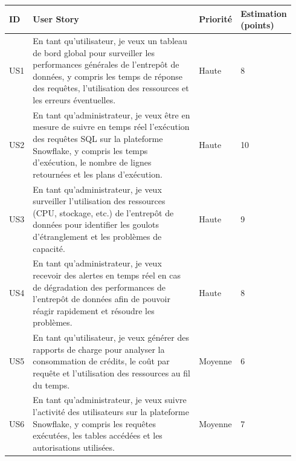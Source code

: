 \begin{center}

    \begin{longtable}{|p{0.05\linewidth}|p{0.65\linewidth}|p{0.12\linewidth}|p{0.12\linewidth}|}
        \hline       
        \rowcolor{blue!18}\textbf{ID} & \textbf{User Story} &  \textbf{Priorité} & \textbf{Estimation (points)} \\
        \hline
        \endfirsthead
        US1 &  En tant qu'utilisateur, je veux un tableau de bord global pour surveiller les performances générales de l'entrepôt de données, y compris les temps de réponse des requêtes, l'utilisation des ressources et les erreurs éventuelles. & Haute & 8 \\
        
        \hline
        
        US2 &  En tant qu'administrateur, je veux être en mesure de suivre en temps réel l'exécution des requêtes SQL sur la plateforme Snowflake, y compris les temps d'exécution, le nombre de lignes retournées et les plans d'exécution. & Haute & 10 \\
        
        \hline
        
        US3 &  En tant qu'administrateur, je veux surveiller l'utilisation des ressources (CPU, stockage, etc.) de l'entrepôt de données pour identifier les goulots d'étranglement et les problèmes de capacité. & Haute & 9 \\
        
        \hline
        
        US4 &  En tant qu'administrateur, je veux recevoir des alertes en temps réel en cas de dégradation des performances de l'entrepôt de données afin de pouvoir réagir rapidement et résoudre les problèmes. & Haute & 8 \\
        
        \hline
        
        US5 & En tant qu'utilisateur, je veux générer des rapports de charge pour analyser la consommation de crédits, le coût par requête et l'utilisation des ressources au fil du temps. & Moyenne & 6 \\
        
        \hline
        
        US6 &  En tant qu'administrateur, je veux suivre l'activité des utilisateurs sur la plateforme Snowflake, y compris les requêtes exécutées, les tables accédées et les autorisations utilisées. & Moyenne & 7 \\
        

\end{longtable}
\end{center}
